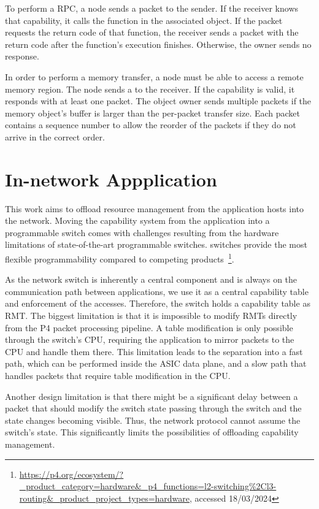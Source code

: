 To perform a \ac{RPC}, a node sends a  packet to the sender. If the receiver knows that capability, it calls the function in the associated object. If the  packet requests the return code of that function, the receiver sends a  packet with the return code after the function's execution finishes. Otherwise, the owner sends no response.

In order to perform a memory transfer, a node must be able to access a remote memory region. The node sends a  to the receiver. If the capability is valid, it responds with at least one  packet. The object owner sends multiple packets if the memory object's buffer is larger than the per-packet transfer size. Each packet contains a sequence number to allow the reorder of the packets if they do not arrive in the correct order.

\section{In-network Appplication}\label{sec:design-dos-protection}
This work aims to offload resource management from the application hosts into the network. Moving the capability system from the application into a programmable switch comes with challenges resulting from the hardware limitations of state-of-the-art programmable switches. \tofino{} switches provide the most flexible programmability compared to competing products~\footnote{\url{https://p4.org/ecosystem/?_product_category=hardware&_p4_functions=l2-switching\%2Cl3-routing&_product_project_types=hardware}, accessed 18/03/2024}.\@

As the network switch is inherently a central component and is always on the communication path between applications, we use it as a central capability table and enforcement of the accesses. Therefore, the switch holds a capability table as \ac{RMT}. The biggest limitation is that it is impossible to modify \acp{RMT} directly from the P4 packet processing pipeline. A table modification is only possible through the switch's \ac{CPU}, requiring the application to mirror packets to the \ac{CPU} and handle them there. This limitation leads to the separation into a fast path, which can be performed inside the \ac{ASIC} data plane, and a slow path that handles packets that require table modification in the \ac{CPU}.

Another design limitation is that there might be a significant delay between a packet that should modify the switch state passing through the switch and the state changes becoming visible. Thus, the network protocol cannot assume the switch's state. This significantly limits the possibilities of offloading capability management.

